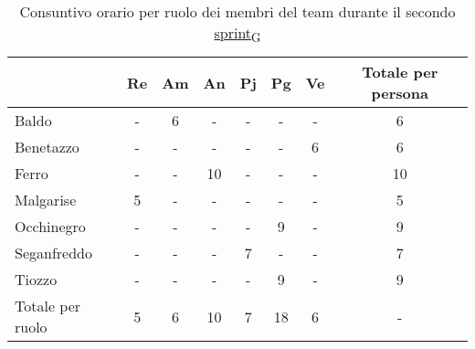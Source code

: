 \begin{table}[!h]
	\centering
	\begin{tabular}{ | l | c | c | c | c | c | c | c | }
		\hline
		\textbf{}        & \textbf{Re} & \textbf{Am} & \textbf{An} & \textbf{Pj} & \textbf{Pg} & \textbf{Ve} & \textbf{Totale per persona} \\
		\hline
		Baldo            & -           & 6           & -           & -           & -           & -           & 6                           \\
		Benetazzo        & -           & -           & -           & -           & -           & 6           & 6                           \\
		Ferro            & -           & -           & 10          & -           & -           & -           & 10                          \\
		Malgarise        & 5           & -           & -           & -           & -           & -           & 5                           \\
		Occhinegro       & -           & -           & -           & -           & 9           & -           & 9                           \\
		Seganfreddo      & -           & -           & -           & 7           & -           & -           & 7                           \\
		Tiozzo           & -           & -           & -           & -           & 9           & -           & 9                           \\
		\hline
		Totale per ruolo & 5           & 6           & 10          & 7           & 18          & 6           & -                           \\
		\hline
	\end{tabular}
	\caption{Consuntivo orario per ruolo dei membri del team durante il secondo \href{https://7last.github.io/docs/rtb/documentazione-interna/glossario\#sprint}{sprint\textsubscript{G}}}
	
\end{table}

